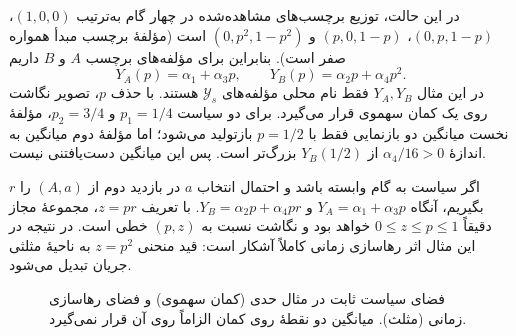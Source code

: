 در این حالت، توزیع برچسب‌های مشاهده‌شده در چهار گام به‌ترتیب $(1,0,0)$، $(0,p,1-p)$، $(p,0,1-p)$ و $(0,p^2,1-p^2)$ است (مؤلفهٔ برچسب مبدأ همواره صفر است). بنابراین برای مؤلفه‌های برچسب $A$ و $B$ داریم
\begin{equation}\label{cmp:eq:ch3-geometry-nonconvex-curve}
Y_A(p)=\alpha_1+\alpha_3p,\qquad Y_B(p)=\alpha_2p+\alpha_4p^2.
\end{equation}
در این مثال $Y_A,Y_B$ فقط نام محلی مؤلفه‌های $\mathscr Y_s$ هستند. با حذف $p$، تصویر نگاشت روی یک کمان سهموی قرار می‌گیرد. برای دو سیاست $p_1=1/4$ و $p_2=3/4$، مؤلفهٔ نخست میانگین دو بازنمایی فقط با $p=1/2$ بازتولید می‌شود؛ اما مؤلفهٔ دوم میانگین به اندازهٔ $\alpha_4/16>0$ از $Y_B(1/2)$ بزرگ‌تر است. پس این میانگین دست‌یافتنی نیست.

اگر سیاست به گام وابسته باشد و احتمال انتخاب $a$ در بازدید دوم از $(A,a)$ را $r$ بگیریم، آنگاه $Y_A=\alpha_1+\alpha_3p$ و $Y_B=\alpha_2p+\alpha_4pr$. با تعریف $z=pr$، مجموعهٔ مجاز دقیقاً $0\le z\le p\le1$ خواهد بود و نگاشت نسبت به $(p,z)$ خطی است. در نتیجه در این مثال اثر رهاسازی زمانی کاملاً آشکار است: قید منحنی $z=p^2$ به ناحیهٔ مثلثی جریان تبدیل می‌شود.

\begin{figure}[!htbp]
\centering
\begin{LTR}
\end{LTR}
\caption{فضای سیاست ثابت در مثال حدی (کمان سهموی) و فضای رهاسازی زمانی (مثلث). میانگین دو نقطهٔ روی کمان الزاماً روی آن قرار نمی‌گیرد.}
\label{cmp:fig:ch3-geometry-nonconvex-curve}
\end{figure}

